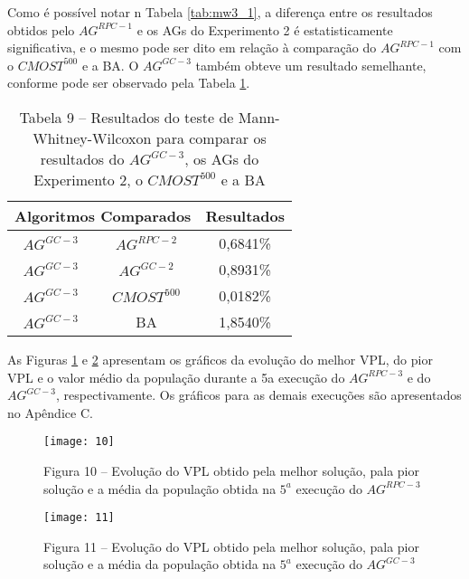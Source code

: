 Como é possível notar n Tabela \ref{tab:mw3_1}, a diferença entre os resultados obtidos pelo $AG^{RPC-1}$ e os AGs do Experimento 2 é estatisticamente significativa, e o mesmo pode ser dito em relação à comparação do $AG^{RPC-1}$ com o $CMOST^500$ e a BA. O $AG^{GC-3}$ também obteve um resultado semelhante, conforme pode ser observado pela Tabela \ref{tab:mw3_2}.

\begin{table}[H]
\centering
\caption{Tabela 9 – Resultados do teste de Mann-Whitney-Wilcoxon para comparar os resultados do $AG^{GC-3}$, os AGs do Experimento 2, o $CMOST^500$ e a BA}
\label{tab:mw3_2}
\begin{tabular}{|c|c|c|}
\hline
\multicolumn{2}{|c|}{Algoritmos Comparados} & Resultados \\ \hline
$AG^{GC-3}$ & $AG^{RPC-2}$ & 0,6841\% \\ \hline
$AG^{GC-3}$ & $AG^{GC-2}$ & 0,8931\% \\ \hline
$AG^{GC-3}$ & $CMOST^500$ & 0,0182\% \\ \hline
$AG^{GC-3}$ & BA & 1,8540\% \\ \hline

\end{tabular}
\end{table}

As Figuras \ref{fig:graph3_1} e \ref{fig:graph3_2} apresentam os gráficos da evolução do melhor VPL, do pior VPL e o valor médio da população durante a 5a execução do $AG^{RPC-3}$ e do $AG^{GC-3}$, respectivamente. Os gráficos para as demais execuções são apresentados no Apêndice C. 

\begin{figure}[H]
\centering
\texttt{[image: 10]}
\caption{Figura 10 – Evolução do VPL obtido pela melhor solução, pala pior solução e a média da população obtida na $5^a$ execução do $AG^{RPC-3}$}
\label{fig:graph3_1}
\end{figure}

\begin{figure}[H]
\centering
\texttt{[image: 11]}
\caption{Figura 11 – Evolução do VPL obtido pela melhor solução, pala pior solução e a média da população obtida na $5^a$ execução do $AG^{GC-3}$}
\label{fig:graph3_2}
\end{figure}

